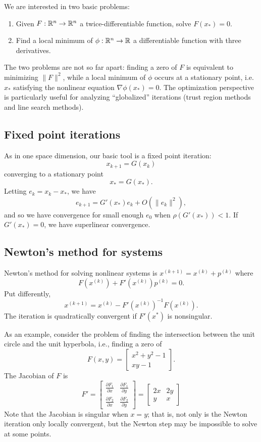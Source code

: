 \documentclass[12pt, leqno]{article}
\begin{document}
We are interested in two basic problems:
\begin{enumerate}
\item Given $F : \mathbb{R}^n \rightarrow \mathbb{R}^n$ a twice-differentiable
  function, solve $F(x_*) = 0$.
\item Find a local minimum of $\phi : \mathbb{R}^n \rightarrow \mathbb{R}$ a
  differentiable function with three derivatives.
\end{enumerate}
The two problems are not so far apart: finding a zero of $F$ is
equivalent to minimizing $\|F\|^2$, while a local minimum of
$\phi$ occurs at a stationary point, i.e.~$x_*$ satisfying the
nonlinear equation $\nabla \phi(x_*) = 0$.  The optimization
perspective is particularly useful for analyzing ``globalized''
iterations (trust region methods and line search methods).

\subsection{Fixed point iterations}

As in one space dimension, our basic tool is a fixed point iteration:
\[
  x_{k+1} = G(x_k)
\]
converging to a stationary point
\[
  x_* = G(x_*).
\]
Letting $e_k = x_k-x_*$, we have
\[
  e_{k+1} = G'(x_*) e_k + O(\|e_k\|^2),
\]
and so we have convergence for small enough $e_0$ when
$\rho(G'(x_*)) < 1$.  If $G'(x_*) = 0$, we have superlinear
convergence.

\subsection{Newton's method for systems}

Newton's method for solving nonlinear systems is
$x^{(k+1)} = x^{(k)} + p^{(k)}$ where
\[
  F(x^{(k)}) + F'(x^{(k)}) p^{(k)} = 0.
\]
Put differently,
\[
  x^{(k+1)} = x^{(k)} - F'(x^{(k)})^{-1} F(x^{(k)}).
\]
The iteration is quadratically convergent if $F'(x^*)$ is
nonsingular.

As an example, consider the problem of finding the intersection
between the unit circle and the unit hyperbola, i.e., finding a
zero of
\[
  F(x,y) = \begin{bmatrix} x^2 + y^2 - 1 \\ xy - 1 \end{bmatrix}.
\]
The Jacobian of $F$ is
\[
  F' =
  \begin{bmatrix}
    \frac{\partial F_1}{\partial x} &
    \frac{\partial F_1}{\partial y} \\
    \frac{\partial F_2}{\partial x} &
    \frac{\partial F_2}{\partial y}
  \end{bmatrix} =
  \begin{bmatrix}
    2x & 2y \\
    y & x
  \end{bmatrix}
\]
Note that the Jacobian is singular when $x = y$; that is, not only is
the Newton iteration only locally convergent, but the Newton step may
be impossible to solve at some points.
\end{document}
